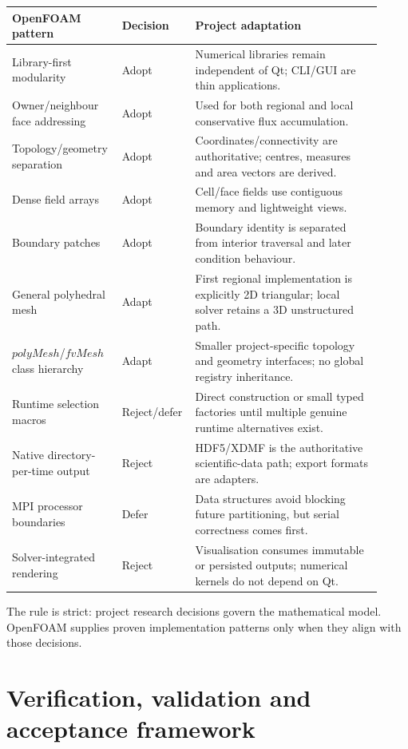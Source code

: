 \documentclass[11pt,a4paper]{article}
\begin{document}
\begin{longtable}{p{0.27\linewidth}p{0.16\linewidth}p{0.49\linewidth}}
\toprule
OpenFOAM pattern & Decision & Project adaptation\\
\midrule
Library-first modularity & Adopt & Numerical libraries remain independent of Qt; CLI/GUI are thin applications.\\
Owner/neighbour face addressing & Adopt & Used for both regional and local conservative flux accumulation.\\
Topology/geometry separation & Adopt & Coordinates/connectivity are authoritative; centres, measures and area vectors are derived.\\
Dense field arrays & Adopt & Cell/face fields use contiguous memory and lightweight views.\\
Boundary patches & Adopt & Boundary identity is separated from interior traversal and later condition behaviour.\\
General polyhedral mesh & Adapt & First regional implementation is explicitly 2D triangular; local solver retains a 3D unstructured path.\\
$polyMesh$/$fvMesh$ class hierarchy & Adapt & Smaller project-specific topology and geometry interfaces; no global registry inheritance.\\
Runtime selection macros & Reject/defer & Direct construction or small typed factories until multiple genuine runtime alternatives exist.\\
Native directory-per-time output & Reject & HDF5/XDMF is the authoritative scientific-data path; export formats are adapters.\\
MPI processor boundaries & Defer & Data structures avoid blocking future partitioning, but serial correctness comes first.\\
Solver-integrated rendering & Reject & Visualisation consumes immutable or persisted outputs; numerical kernels do not depend on Qt.\\
\bottomrule
\end{longtable}

The rule is strict: project research decisions govern the mathematical model. OpenFOAM supplies proven implementation patterns only when they align with those decisions.

\section{Verification, validation and acceptance framework}
\end{document}
